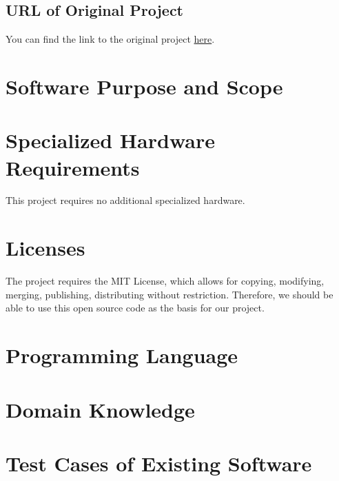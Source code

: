 \documentclass[12pt]{article}
\begin{document}
\subsection{URL of Original Project}
You can find the link to the original project \href{https://github.com/Code-Plus-Plus/discord-meeting-bot}{here}.

\section{Software Purpose and Scope}

\section{Specialized Hardware Requirements}
This project requires no additional specialized hardware.

\section{Licenses}
The project requires the MIT License, which allows for copying, modifying, merging, publishing, distributing without restriction. Therefore, we should be able to use this open source code as the basis for our project.

\section{Programming Language}

\section{Domain Knowledge}

\section{Test Cases of Existing Software}
\end{document}
